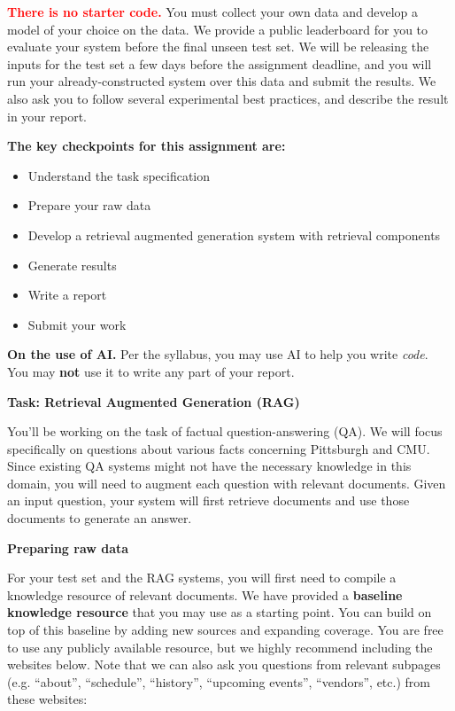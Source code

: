 \documentclass[11pt]{article}
\newcommand{\problem}[1]{%
  \vspace{1em}
  \noindent\colorbox{headerblue}{\parbox{\dimexpr\textwidth-2\fboxsep}{%
    \vspace{2pt}\textbf{\large #1}\vspace{2pt}}}
  \vspace{0.6em}
}
\newcommand{\subsec}[1]{%
  \vspace{0.8em}
  \noindent{\sffamily\bfseries\color{mauve} #1}
  \vspace{0.35em}
  \par
}
\begin{document}
\vspace{0.6em}
\noindent\textcolor{red}{\textbf{There is no starter code.}} You must collect your own data and
develop a model of your choice on the data. We provide a public leaderboard for you to evaluate your
system before the final unseen test set. We will be releasing the inputs for the test set a few days
before the assignment deadline, and you will run your already-constructed system over this data and
submit the results. We also ask you to follow several experimental best practices, and describe the
result in your report.

\vspace{0.6em}
\noindent\textbf{The key checkpoints for this assignment are:}
\begin{itemize}[nosep, leftmargin=2em]
  \item Understand the task specification
  \item Prepare your raw data
  \item Develop a retrieval augmented generation system with retrieval components
  \item Generate results
  \item Write a report
  \item Submit your work
\end{itemize}

\vspace{0.6em}
\noindent\textbf{On the use of AI.} Per the syllabus, you may use AI to help you write \emph{code}.
You may \textbf{not} use it to write any part of your report.

\problem{Task: Retrieval Augmented Generation (RAG)}

\noindent You'll be working on the task of factual question-answering (QA). We will focus
specifically on questions about various facts concerning Pittsburgh and CMU. Since existing QA
systems might not have the necessary knowledge in this domain, you will need to augment each question
with relevant documents. Given an input question, your system will first retrieve documents and use
those documents to generate an answer.

\problem{Preparing raw data}

\subsec{Compiling a knowledge resource}

\noindent For your test set and the RAG systems, you will first need to compile a knowledge resource
of relevant documents. We have provided a \textbf{baseline knowledge resource} that you may use as a
starting point. You can build on top of this baseline by adding new sources and expanding coverage.
You are free to use any publicly available resource, but we highly recommend including the websites
below. Note that we can also ask you questions from relevant subpages (e.g. ``about'', ``schedule'',
``history'', ``upcoming events'', ``vendors'', etc.) from these websites:
\end{document}
